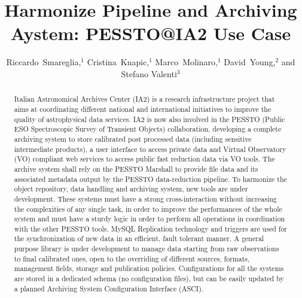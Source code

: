 
\resetcounters




\title{Harmonize Pipeline and Archiving Aystem: PESSTO@IA2 Use Case}
\author{Riccardo~Smareglia,$^1$ Cristina~Knapic,$^1$ Marco~Molinaro,$^1$ David~Young,$^2$ and Stefano Valenti$^3$
}


\begin{abstract}
Italian Astronomical Archives Center (IA2) is a research infrastructure project that aims at coordinating different national and international initiatives to improve the quality of astrophysical data services. IA2 is now also involved in the PESSTO (Public ESO Spectroscopic Survey of Transient Objects) collaboration, developing a complete archiving system to store calibrated post processed data (including sensitive intermediate products), a user interface to access private data and Virtual Observatory (VO) compliant web services to access public fast reduction data via VO tools. The archive system shall rely on the PESSTO Marshall to provide file data and its associated metadata output by the PESSTO data-reduction pipeline. To harmonize the object repository, data handling and archiving system, new tools are under development. These systems must have a strong cross-interaction without increasing the complexities of any single task, in order to improve the performances of the whole system and must have a sturdy logic in order to perform all operations in coordination with the other PESSTO tools. MySQL Replication technology and triggers are used for the synchronization of new data in an efficient, fault tolerant manner. A general purpose library is under development to manage data starting from raw observations to final calibrated ones, open to the overriding of different sources, formats, management fields, storage and publication policies. Configurations for all the systems are stored in a dedicated schema (no configuration files), but can be easily updated by a planned Archiving System Configuration Interface (ASCI). 
\end{abstract}


